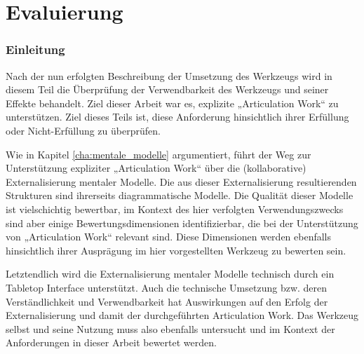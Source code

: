 \part{Evaluierung} %
\label{prt:evaluierung}

\section*{Einleitung} %
\label{sec:evaluierung_einleitung}
\thispagestyle{empty}


Nach der nun erfolgten Beschreibung der Umsetzung des Werkzeugs wird in diesem Teil die Überprüfung der Verwendbarkeit des Werkzeugs und seiner Effekte behandelt. Ziel dieser Arbeit war es, explizite „Articulation Work“ zu unterstützen. Ziel dieses Teils ist, diese Anforderung hinsichtlich ihrer Erfüllung oder Nicht-Erfüllung zu überprüfen. 

Wie in Kapitel \ref{cha:mentale_modelle} argumentiert, führt der Weg zur Unterstützung expliziter „Articulation Work“ über die (kollaborative) Externalisierung mentaler Modelle. Die aus dieser Externalisierung resultierenden Strukturen sind ihrerseits diagrammatische Modelle. Die Qualität dieser Modelle ist vielschichtig bewertbar, im Kontext des hier verfolgten Verwendungszwecks sind aber einige Bewertungsdimensionen identifizierbar, die bei der Unterstützung von „Articulation Work“ relevant sind. Diese Dimensionen werden ebenfalls hinsichtlich ihrer Ausprägung im hier vorgestellten Werkzeug zu bewerten sein. 

Letztendlich wird die Externalisierung mentaler Modelle technisch durch ein Tabletop Interface unterstützt. Auch die technische Umsetzung bzw. deren Verständlichkeit und Verwendbarkeit hat Auswirkungen auf den Erfolg der Externalisierung und damit der durchgeführten Articulation Work. Das Werkzeug selbst und seine Nutzung muss also ebenfalls untersucht und im Kontext der Anforderungen in dieser Arbeit bewertet werden. 

